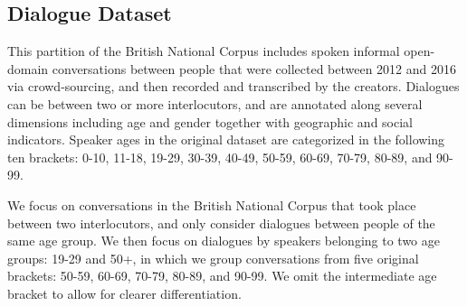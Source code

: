 \begin{table*}[h]
    \caption{Descriptive statistics of the datasets used in our experiments. {Length} is the number of tokens in a sample.}

    
    \label{tab:summary_corpora}
\end{table*}

\subsection{Dialogue Dataset}\label{sec:datadialogue}
\label{subsec:dialogue_dataset}


This partition of the British National Corpus includes spoken informal open-domain conversations between people that were collected between 2012 and 2016 via crowd-sourcing, and then recorded and transcribed by the creators. Dialogues can be between two or more interlocutors, and are annotated
along several dimensions including age and gender together with geographic and social indicators. Speaker ages in the original dataset are categorized in the following ten brackets: 0-10, 11-18, 19-29, 30-39, 40-49, 50-59, 60-69, 70-79, 80-89, and 90-99.


We focus on conversations in the British National Corpus that took place between two interlocutors,
and only consider dialogues
between people of the same age group. 
We then focus on dialogues by speakers belonging to two age groups: 19-29 and 50+, in which we group conversations from five original brackets: 50-59, 60-69, 70-79, 80-89, and 90-99.
We omit the intermediate age bracket to allow for clearer differentiation.


